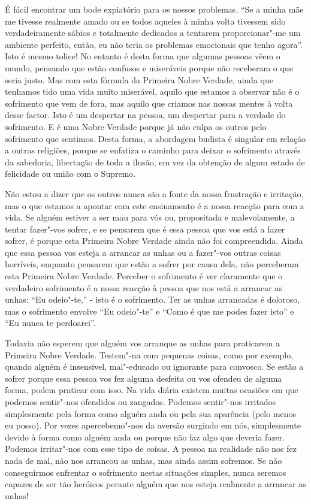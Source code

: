 É fácil encontrar um bode expiatório para os nossos problemas. “Se a minha mãe
me tivesse realmente amado ou se todos aqueles à minha volta tivessem sido
verdadeiramente sábios e totalmente dedicados a tentarem proporcionar"-me um
ambiente perfeito, então, eu não teria os problemas emocionais que tenho agora”.
Isto é mesmo tolice! No entanto é desta forma que algumas pessoas vêem o mundo,
pensando que estão confusos e miseráveis porque não receberam o que seria justo.
Mas com esta fórmula da Primeira Nobre Verdade, ainda que tenhamos tido uma vida
muito miserável, aquilo que estamos a observar não é o sofrimento que vem de
fora, mas aquilo que criamos nas nossas mentes à volta desse factor. Isto é um
despertar na pessoa, um despertar para a verdade do sofrimento. E é uma Nobre
Verdade porque já não culpa os outros pelo sofrimento que sentimos. Desta forma,
a abordagem budista é singular em relação a outras religiões, porque se enfatiza
o caminho para deixar o sofrimento através da sabedoria, libertação de toda a
ilusão, em vez da obtenção de algum estado de felicidade ou união com o Supremo.

Não estou a dizer que os outros nunca são a fonte da nossa frustração e
irritação, mas o que estamos a apontar com este ensinamento é a nossa
reacção para com a vida. Se alguém estiver a ser mau para vós ou, propositada e
malevolamente, a tentar fazer"-vos sofrer, e se pensarem que é essa pessoa que
vos está a fazer sofrer, é porque esta Primeira Nobre Verdade ainda não foi compreendida.
Ainda que essa pessoa vos esteja a arrancar as unhas ou a fazer"-vos outras coisas
horríveis, enquanto pensarem que estão a sofrer por causa dela, não
perceberam esta Primeira Nobre Verdade. Perceber o sofrimento é ver claramente
que o verdadeiro sofrimento é a nossa reacção à pessoa que nos está a arrancar as unhas:
“Eu odeio"-te,” - isto é o sofrimento. Ter as unhas arrancadas é doloroso, mas o sofrimento 
envolve “Eu odeio"-te” e “Como é que me podes fazer isto” e “Eu nunca te perdoarei”.

Todavia não esperem que alguém vos arranque as unhas para praticarem a
Primeira Nobre Verdade. Testem"-na com pequenas coisas, como por exemplo, quando
alguém é insensível, mal"-educado ou ignorante para convosco. Se estão a sofrer
porque essa pessoa vos fez alguma desfeita ou vos ofendeu de alguma forma, podem
praticar com isso. Na vida diária existem muitas ocasiões em que podemos
sentir"-nos ofendidos ou zangados. Podemos sentir"-nos irritados simplesmente pela
forma como alguém anda ou pela sua aparência (pelo menos eu posso). Por vezes
apercebemo"-nos da aversão surgindo em nós, simplesmente devido à forma como
alguém anda ou porque não faz algo que deveria fazer. Podemos irritar"-nos com
esse tipo de coisas. A pessoa na realidade não nos fez nada de mal, não nos
arrancou as unhas, mas ainda assim sofremos. Se não conseguirmos enfrentar o
sofrimento nestas situações simples, nunca seremos capazes de ser tão heróicos
perante alguém que nos esteja realmente a arrancar as unhas!

